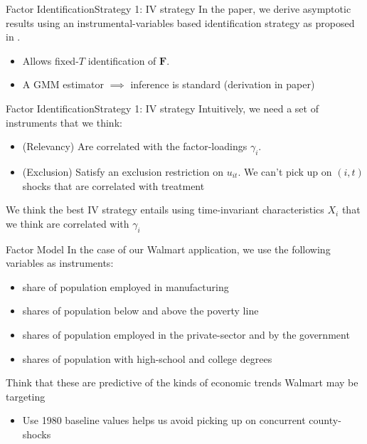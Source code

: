 \documentclass[aspectratio=169,t,11pt]{beamer}
\begin{document}
\begin{frame}{Factor Identification}{Strategy 1: IV strategy}\label{slide:qld_strategy}
  In the paper, we derive asymptotic results using an instrumental-variables based identification strategy as proposed in .
  \begin{itemize}
    \item Allows fixed-$T$ identification of $\bm{F}$.
    \item A GMM estimator $\implies$ inference is standard (derivation in paper)
  \end{itemize}

\end{frame}

\begin{frame}{Factor Identification}{Strategy 1: IV strategy}
  Intuitively, we need a set of instruments that we think:

  \begin{itemize}
    \item {\color{zinc500} (Relevancy)} Are correlated with the factor-loadings $\gamma_i$.

    \item {\color{zinc500} (Exclusion)} Satisfy an exclusion restriction on $u_{it}$. We can't pick up on $(i,t)$ shocks that are correlated with treatment
  \end{itemize}

  \bigskip
  We think the best IV strategy entails using time-invariant characteristics $X_i$ that we think are correlated with $\gamma_i$

\end{frame}

\begin{frame}{Factor Model}
  In the case of our Walmart application, we use the following variables as instruments:
  \begin{itemize}
    \item share of population employed in manufacturing
    \item shares of population below and above the poverty line
    \item shares of population employed in the private-sector and by the government
    \item shares of population with high-school and college degrees
  \end{itemize}

  \bigskip
  Think that these are predictive of the kinds of economic trends Walmart may be targeting
  \begin{itemize}
    \item Use 1980 baseline values helps us avoid picking up on concurrent county-shocks
  \end{itemize}
\end{frame}
\end{document}

